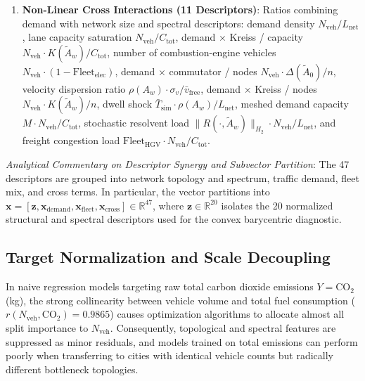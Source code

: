 \documentclass[journal]{IEEEtran}
\begin{document}
\begin{enumerate}
\begin{enumerate}
        \item Kreiss transient growth constants $K(\tilde{A}_0)$ and $K(\tilde{A}_w)$ from \eqref{eq:kreiss} (2 descriptors).
        \item Discrete Hardy $H_2$ resolvent norms $\|R(\cdot, \tilde{A}_0)\|_{H_2}$ and $\|R(\cdot, \tilde{A}_w)\|_{H_2}$ from \eqref{eq:hardy_lyapunov} (2 descriptors).
        \item $\epsilon$-pseudospectral radii $\alpha_{0.01}(\tilde{A}_0)$ and $\alpha_{0.01}(\tilde{A}_w)$ from \eqref{eq:pseudospectral_radius} (2 descriptors).
        \item Maximum link sensitivity descriptors $S_{\max}(A_0)$ and $S_{\max}(A_w)$ defined in \eqref{eq:max_link_sensitivity} (2 descriptors).
    \end{enumerate}
    \item \textbf{Non-Linear Cross Interactions (11 Descriptors)}: Ratios combining demand with network size and spectral descriptors: demand density $N_{\text{veh}} / L_{\text{net}}$, lane capacity saturation $N_{\text{veh}} / C_{\text{tot}}$, demand $\times$ Kreiss / capacity $N_{\text{veh}} \cdot K(\tilde{A}_w) / C_{\text{tot}}$, number of combustion-engine vehicles $N_{\text{veh}} \cdot (1 - \text{Fleet}_{\text{elec}})$, demand $\times$ commutator / nodes $N_{\text{veh}} \cdot \Delta(\tilde{A}_0) / n$, velocity dispersion ratio $\rho(A_w) \cdot \sigma_v / \bar{v}_{\text{free}}$, demand $\times$ Kreiss / nodes $N_{\text{veh}} \cdot K(\tilde{A}_w) / n$, dwell shock $\bar{T}_{\text{sim}} \cdot \rho(A_w) / L_{\text{net}}$, meshed demand capacity $M \cdot N_{\text{veh}} / C_{\text{tot}}$, stochastic resolvent load $\|R(\cdot, \tilde{A}_w)\|_{H_2} \cdot N_{\text{veh}} / L_{\text{net}}$, and freight congestion load $\text{Fleet}_{\text{HGV}} \cdot N_{\text{veh}} / C_{\text{tot}}$.
\end{enumerate}

\textit{Analytical Commentary on Descriptor Synergy and Subvector Partition}:
The 47 descriptors are grouped into network topology and spectrum, traffic demand, fleet mix, and cross terms. In particular, the vector partitions into $\mathbf{x} = [\mathbf{z}, \mathbf{x}_{\text{demand}}, \mathbf{x}_{\text{fleet}}, \mathbf{x}_{\text{cross}}] \in \mathbb{R}^{47}$, where $\mathbf{z} \in \mathbb{R}^{20}$ isolates the 20 normalized structural and spectral descriptors used for the convex barycentric diagnostic.

\subsection{Target Normalization and Scale Decoupling}
In naive regression models targeting raw total carbon dioxide emissions $Y = \text{CO}_2$ (kg), the strong collinearity between vehicle volume and total fuel consumption ($r(N_{\text{veh}}, \text{CO}_2) = 0.9865$) causes optimization algorithms to allocate almost all split importance to $N_{\text{veh}}$. Consequently, topological and spectral features are suppressed as minor residuals, and models trained on total emissions can perform poorly when transferring to cities with identical vehicle counts but radically different bottleneck topologies.
\end{document}
